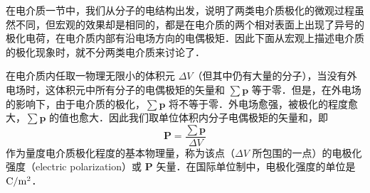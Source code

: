 
\begin{issues}
\end{issues}


在电介质一节中，我们从分子的电结构出发，说明了两类电介质极化的微观过程虽然不同，但宏观的效果却是相同的，都是在电介质的两个相对表面上出现了异号的极化电荷，在电介质内部有沿电场方向的电偶极矩．因此下面从宏观上描述电介质的极化现象时，就不分两类电介质来讨论了．

在电介质内任取一物理无限小的体积元 $\Delta V$（但其中仍有大量的分子），当没有外电场时，这体积元中所有分子的电偶极矩的矢量和 $\sum \mathbf p$ 等于零．但是，在外电场的影响下，由于电介质的极化，$\sum \mathbf p$ 将不等于零．外电场愈强，被极化的程度愈大，$\sum \mathbf p$ 的值也愈大．因此我们取单位体积内分子电偶极矩的矢量和，即
\begin{equation}
\mathbf P=\frac{\sum \mathbf p}{\Delta V} 
\end{equation}
作为量度电介质极化程度的基本物理量，称为该点（$\Delta V$ 所包围的一点）的电极化强度（electric polarization）或 $\mathbf P$ 矢量．在国际单位制中，电极化强度的单位是 $\rm C/m^2$．
